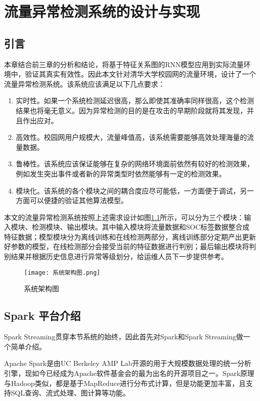 \chapter{流量异常检测系统的设计与实现}
\section{引言}
本章结合前三章的分析和结论，将基于特征关系图的RNN模型应用到实际流量环境中，验证其真实有效性。因此本文针对清华大学校园网的流量环境，设计了一个流量异常检测系统。该系统应该满足以下几点要求：
\begin{enumerate}
  \item 实时性。如果一个系统检测延迟很高，那么即使其准确率同样很高，这个检测结果也将毫无意义。因为异常检测的目的是在攻击的早期阶段就将其发现，并且作出应对。
  \item 高效性。校园网用户规模大，流量峰值高，该系统需要能够高效处理海量的流量数据。
  \item 鲁棒性。该系统应该保证能够在复杂的网络环境面前依然有较好的检测效果，例如发生突出事件或者新的异常类型时依然能够有一定的检测效果。
  \item 模块化。该系统的各个模块之间的耦合度应尽可能低，一方面便于调试，另一方面可以便捷的验证其他算法模型。
\end{enumerate}

本文的流量异常检测系统按照上述需求设计如图\ref{fig:arch}所示，可以分为三个模块：输入模块、检测模块、输出模块。其中输入模块将流量数据和SOC标签数据整合成特征数据；模型模块分为离线训练和在线检测两部分，离线训练部分定期产出更新好参数的模型，在线检测部分会接受当前的特征数据进行判别；最后输出模块将判别结果并根据历史信息进行异常等级划分，给运维人员下一步提供参考。
\begin{figure}
    \centering
    \texttt{[image: 系统架构图.png]}
    \caption{系统架构图}
    \label{fig:arch}
  \end{figure}


\section{Spark 平台介绍}
Spark Streaming贯穿本节系统的始终，因此首先对Spark和Spark Streaming做一个简单介绍。

Apache Spark是由UC Berkeley AMP Lab开源的用于大规模数据处理的统一分析引擎\cite{spark}，现如今已经成为Apache软件基金会的最为出名的开源项目之一。Spark原理与Hadoop类似，都是基于MapReduce进行分布式计算，但是功能更加丰富，且支持SQL查询、流式处理、图计算等功能。

